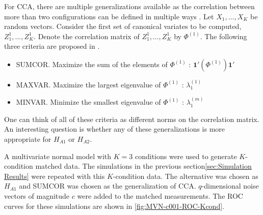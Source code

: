 \documentclass[11pt]{article} %
\begin{document}
For CCA, there are multiple generalizations available as the correlation between more than two configurations can be defined in multiple ways \cite{generalCCA}. Let $X_1,\ldots,X_K$ be random vectors. Consider the first set of canonical variates to be computed, $Z_1^{1},\ldots,Z_K^{1}$. Denote  the correlation matrix of  $Z_1^{1},\ldots,Z_K^{1}$ by $\Phi^{(1)}$.   The following three criteria  are proposed in \cite{generalCCA}.
\begin{itemize}
\item SUMCOR. Maximize the sum of the elements of $\Phi^{(1)}$ : $\mathbf{1'}(\Phi^{(1)})\mathbf{1'}$
\item MAXVAR. Maximize the largest eigenvalue of $\Phi^{(1)}$ : $\lambda^{(1)}_1$ 
\item  MINVAR. Minimize  the smallest eigenvalue of $\Phi^{(1)}$ : $\lambda^{(m)}_1$ 
\end{itemize}
One can think of all of these criteria as different norms on the correlation matrix.
An interesting question is whether any of these generalizations is more appropriate for $H_{A1}$ or $H_{A2}$.

A multivariate normal model with $K=3$ conditions were used to generate $K$-condition matched data. 
The simulations in the previous section\ref{sec:Simulation Results} were repeated with this $K$-condition data. 
The alternative was chosen as $ H_{A1}$ and SUMCOR was chosen as the generalization of CCA.
 $q$-dimensional noise vectors of magnitude $c$ were added to the matched measurements. 
 The ROC curves for these simulations are shown in \ref{fig:MVN-c001-ROC-Kcond}.


 
\end{document}
